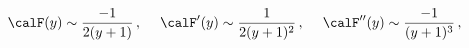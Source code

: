 \begin{equation}
 \calF(y) \sim \frac{-1}{2(y+1)}\,, \hspace{3ex}
 \calF'(y) \sim \frac{1}{2(y+1)^2}\,, \hspace{3ex}
 \calF''(y) \sim \frac{-1}{(y+1)^3}\,,\label{Fasym}
\end{equation}

